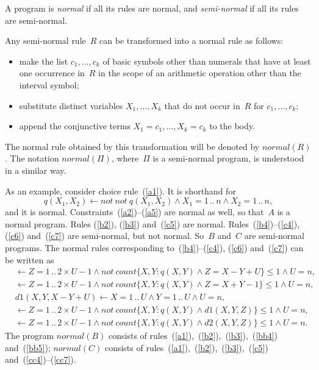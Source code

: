 \documentclass[11pt]{article}
\def\ar{\leftarrow}
\def\beq{\begin{equation}}
\def\eeq#1{\label{#1}\end{equation}}
\newcommand{\co}{\ensuremath{\mathit{count}}}
\newcommand{\no}{\ensuremath{\mathit{not}}}
\begin{document}
\begin{adjustwidth}{-1cm}{-1cm}
A program is \emph{normal} if all its rules are normal,
and \emph{semi-normal} if all its rules are semi-normal.

Any semi-normal rule~$R$ can be transformed into a normal rule as
follows:
\begin{itemize}
\item make the list $c_1,\dots,c_k$ of 
  basic symbols other than numerals that have at least one occurrence in~$R$
  in the scope of an arithmetic operation other than the interval symbol;
\item substitute distinct variables $X_1,\dots,X_k$ that do not occur in~$R$
  for $c_1,\dots,c_k$;
\item append the conjunctive terms $X_1=c_1,\dots,X_k=c_k$ to the body.
\end{itemize}
The normal rule obtained by this transformation will be denoted by
$\mathit{normal}(R)$.  The notation $\mathit{normal}(\Pi)$, where~$\Pi$ is a
semi-normal program, is understood in a similar way.

As an example, consider choice rule~(\ref{a1}).  It is shorthand for
\beq
q(X_1,X_2) \ar \no\ \no\ q(X_1,X_2)
\land X_1 = 1\,..\,n \land X_2= 1\,..\,n,
\eeq{aa1}
and it is normal.  Constraints~(\ref{a2})--(\ref{a5}) are normal as well,
so that~$A$ is a normal program.  Rules (\ref{b2}), (\ref{b3})
and~(\ref{c5}) are normal.  Rules~(\ref{b4})--(\ref{c4}), (\ref{c6})
and~(\ref{c7}) are semi-normal, but not normal.  So~$B$ and~$C$ are
semi-normal programs.
The normal rules corresponding to~(\ref{b4})--(\ref{c4}), (\ref{c6})
and~(\ref{c7}) can be written as
\begin{align}
&\ar Z = 1\,..\,2\times U-1
  \land \no\   \co\{ X,Y : q(X,Y) \land Z = X-Y+U \} \leq  1\land U=n,
  \label{bb4}
  \\
& \ar Z = 1\,..\,2\times U-1
  \land \no\   \co\{ X,Y : q(X,Y) \land Z = X+Y-1 \} \leq  1 \land U=n,
\label{bb5}\\
& d1(X,Y,X-Y+U) \ar X = 1\,..\,U\land  Y = 1\,..\,U\land U=n,\label{cc4}\\
&\ar Z = 1\,..\,2\times U-1\land not\ count \{ X,Y: q(X,Y) \land d1(X,Y,Z) \} \leq 1\land U=n,\label{cc6}\\
&\ar Z = 1\,..\,2\times U-1\land not\ count   \{X,Y:  q(X,Y) \land d2(X,Y,Z) \} \leq 1\land U=n.\label{cc7}    
\end{align}
The program $\mathit{normal}(B)$ consists of
rules~(\ref{a1}),~(\ref{b2}),~(\ref{b3}),~(\ref{bb4}) and~(\ref{bb5});
$\mathit{normal}(C)$ consists of
rules~(\ref{a1}),~(\ref{b2}),~(\ref{b3}),~(\ref{c5})
and~(\ref{cc4})--(\ref{cc7}).


\end{adjustwidth}
\end{document}
